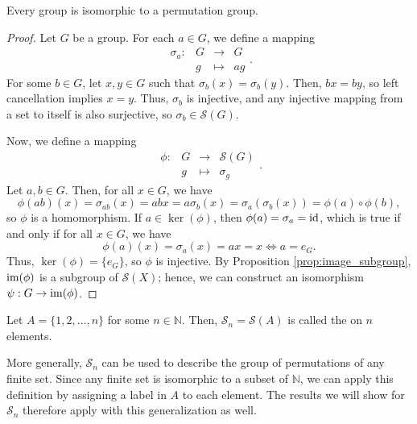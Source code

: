 \begin{thm}
Every group is isomorphic to a permutation group.
\end{thm}
\begin{proof}
Let $ G $ be a group. For each $ a\in G $, we define a mapping
\begin{equation*}
    \begin{array}{rccc}
        \sigma_a: & G & \to & G \\
        & g & \mapsto & ag
    \end{array}.
\end{equation*}
For some $ b\in G $, let $ x,y\in G $ such that $ \sigma_b(x)=\sigma_b(y) $. Then, $ bx=by $, so left cancellation implies $ x=y $. Thus, $ \sigma_b $ is injective, and any injective mapping from a set to itself is also surjective, so $ \sigma_b\in\mathcal{S}(G) $.

Now, we define a mapping
\begin{equation*}
    \begin{array}{rccc}
        \phi: & G & \to & \mathcal{S}(G) \\
        & g & \mapsto & \sigma_g
    \end{array}.
\end{equation*}
Let $ a,b\in G $. Then, for all $ x\in G $, we have
\begin{equation*}
    \phi(ab)(x)=\sigma_{ab}(x)=abx=a\sigma_b(x)=\sigma_a(\sigma_b(x))=\phi(a)\circ\phi(b),
\end{equation*}
so $ \phi $ is a homomorphism. If $ a\in\ker(\phi) $, then $ \phi(a)=\sigma_a=\operatorname{id} $, which is true if and only if for all $ x\in G $, we have
\begin{equation*}
    \phi(a)(x)=\sigma_a(x)=ax=x \iff a=e_G.
\end{equation*}
Thus, $ \ker(\phi)=\{e_G\} $, so $ \phi $ is injective. By Proposition \ref{prop:image_subgroup}, $ \operatorname{im}(\phi) $ is a subgroup of $ \mathcal{S}(X) $; hence, we can construct an isomorphism $ \psi:G\to\operatorname{im}(\phi) $.
\end{proof}

\begin{defn}\label{defn:symmetric_group}
Let $ A=\{1,2,\ldots,n\} $ for some $ n\in\mathbb{N} $. Then, $ \mathcal{S}_n=\mathcal{S}(A) $ is called the  on $ n $ elements.
\end{defn}

More generally, $ \mathcal{S}_n $ can be used to describe the group of permutations of any finite set. Since any finite set is isomorphic to a subset of $ \mathbb{N} $, we can apply this definition by assigning a label in $ A $ to each element. The results we will show for $ \mathcal{S}_n $ therefore apply with this generalization as well.

